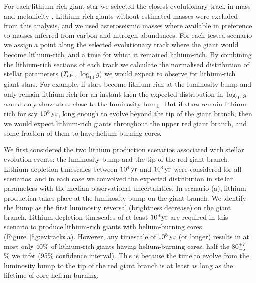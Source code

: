 \documentclass[twocolumn]{aastex62}
\begin{document}
For each lithium-rich giant star we selected the closest evolutionary track in 
mass and metallicity \citep{Dotter_2016,Choi_2016}. Lithium-rich giants without 
estimated masses were excluded from this analysis, and we used asteroseismic masses 
where available in preference to masses inferred from carbon and nitrogen abundances. 
For each tested scenario we assign a point along the selected evolutionary track 
where the giant would become lithium-rich, and a time for which it remained 
lithium-rich. By combining the lithium-rich sections of each track we calculate the normalised distribution 
of stellar parameters ($T_{\rm eff}$, $\log_{10}{g}$) we would expect to 
observe for lithium-rich giant stars. For example, if stars become lithium-rich 
at the luminosity bump and only remain lithium-rich for an instant then the expected
distribution in $\log_{10}{g}$ would only show stars close to the luminosity bump.
But if stars remain lithium-rich for say $10^8\,{\rm yr}$, long enough to evolve 
beyond the tip of the giant branch, then we would expect lithium-rich giants 
throughout the upper red giant branch, and some fraction of them to have
helium-burning cores.


We first considered the two lithium production scenarios associated with stellar evolution
events: the luminosity bump and the tip of the red giant branch. Lithium depletion timescales between $10^4\,{\rm yr}$ and $10^8\,{\rm yr}$ were 
considered for all scenarios, and in each case we convolved the expected distribution in stellar 
parameters with the median observational uncertainties. In scenario (a), lithium 
production takes place at the luminosity bump on the giant branch. We identify the bump 
as the first luminosity reversal (brightness decrease) on the giant branch.
Lithium depletion timescales of at least $10^8\,{\rm yr}$ are 
required in this scenario to produce lithium-rich giants with helium-burning cores (Figure~\ref{fig:evtracks}a).
However, any timescale of $10^8\,{\rm yr}$ (or longer) results in at most only 40\% of lithium-rich giants having helium-burning cores, half the $80^{+7}_{-6}$\,\% we infer (95\% confidence interval).
This is because the time to evolve from the luminosity bump to the tip of the red giant branch is at least as long as the lifetime of core-helium burning.
\end{document}
